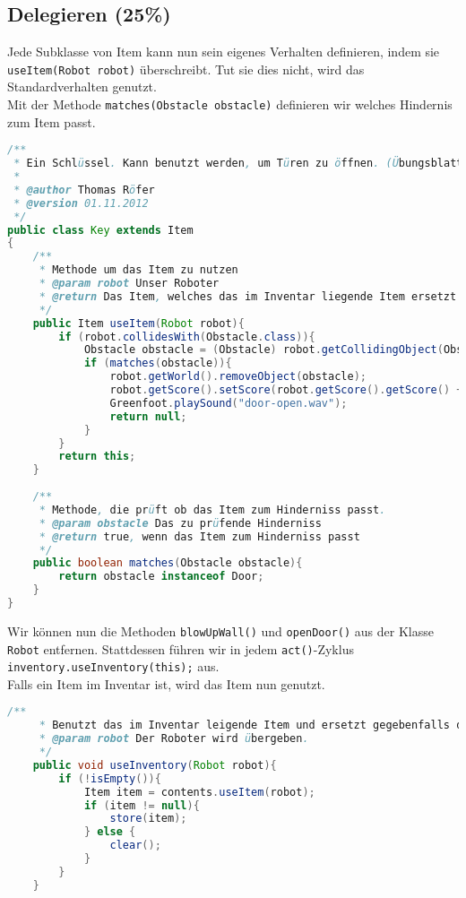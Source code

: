 \documentclass{pi1}
\begin{document}
\subsection{Delegieren (25\%)}

Jede Subklasse von Item kann nun sein eigenes Verhalten definieren, indem sie \texttt{useItem(Robot robot)} überschreibt. Tut sie dies nicht, wird das Standardverhalten genutzt.\\
Mit der Methode \texttt{matches(Obstacle obstacle)} definieren wir welches Hindernis zum Item passt.

\begin{lstlisting}[caption={Klasse \emph{Key}}, firstnumber=1, language=Java]
/**
 * Ein Schlüssel. Kann benutzt werden, um Türen zu öffnen. (Übungsblatt 3)
 * 
 * @author Thomas Röfer 
 * @version 01.11.2012
 */
public class Key extends Item
{
    /**
     * Methode um das Item zu nutzen
     * @param robot Unser Roboter
     * @return Das Item, welches das im Inventar liegende Item ersetzt
     */
    public Item useItem(Robot robot){
        if (robot.collidesWith(Obstacle.class)){
            Obstacle obstacle = (Obstacle) robot.getCollidingObject(Obstacle.class);
            if (matches(obstacle)){
                robot.getWorld().removeObject(obstacle);
                robot.getScore().setScore(robot.getScore().getScore() + 100);
                Greenfoot.playSound("door-open.wav");
                return null;
            }
        }
        return this;
    }
    
    /**
     * Methode, die prüft ob das Item zum Hinderniss passt.
     * @param obstacle Das zu prüfende Hinderniss
     * @return true, wenn das Item zum Hinderniss passt
     */
    public boolean matches(Obstacle obstacle){   
        return obstacle instanceof Door;
    }
}
\end{lstlisting}

Wir können nun die Methoden  \texttt{blowUpWall()} und  \texttt{openDoor()} aus der Klasse  \texttt{Robot} entfernen. Stattdessen führen wir in jedem  \texttt{act()}-Zyklus \texttt{inventory.useInventory(this);} aus.
\\
Falls ein Item im Inventar ist, wird das Item nun genutzt.

\begin{lstlisting}[caption={Klasse \emph{Inventory}, Methode \emph{useInventory}}, firstnumber=67, language=Java]
/**
     * Benutzt das im Inventar leigende Item und ersetzt gegebenfalls das Item
     * @param robot Der Roboter wird übergeben.
     */
    public void useInventory(Robot robot){
        if (!isEmpty()){
            Item item = contents.useItem(robot);
            if (item != null){
                store(item);
            } else {
                clear();
            }
        }
    }
\end{lstlisting}
\end{document}
